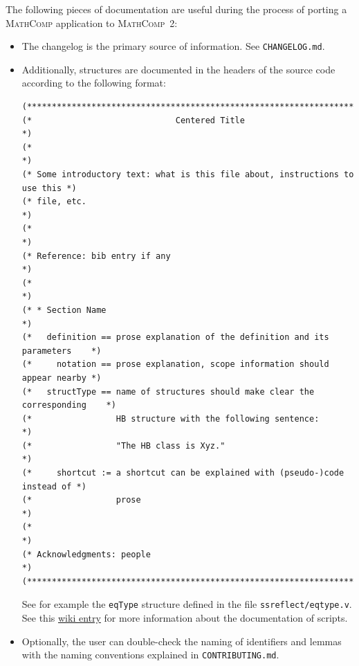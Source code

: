 \documentclass{article}
\def\mathcomp{\textsc{MathComp}}
\def\coqin#1{\texttt{#1}}
\begin{document}
The following pieces of documentation are useful during the process of
porting a \mathcomp{} application to \mathcomp~2:
\begin{itemize}
\item The changelog is the primary source of information. See \coqin{CHANGELOG.md}.
\item Additionally, structures are documented in the headers of the
  source code according to the following format:
\begin{verbatim}
(*****************************************************************************)
(*                             Centered Title                                *)
(*                                                                           *)
(* Some introductory text: what is this file about, instructions to use this *)
(* file, etc.                                                                *)
(*                                                                           *)
(* Reference: bib entry if any                                               *)
(*                                                                           *)
(* * Section Name                                                            *)
(*   definition == prose explanation of the definition and its parameters    *)
(*     notation == prose explanation, scope information should appear nearby *)
(*   structType == name of structures should make clear the corresponding    *)
(*                 HB structure with the following sentence:                 *) 
(*                 "The HB class is Xyz."                                    *)
(*     shortcut := a shortcut can be explained with (pseudo-)code instead of *)
(*                 prose                                                     *)
(*                                                                           *)
(* Acknowledgments: people                                                   *)
(*****************************************************************************)    
\end{verbatim}
See for example the \coqin{eqType} structure defined in the file
\coqin{ssreflect/eqtype.v}.
%
See this
\href{https://github.com/math-comp/analysis/wiki/How-to-document}{wiki
  entry} for more information about the documentation of scripts.
\item Optionally, the user can double-check the naming of identifiers
  and lemmas with the naming conventions explained in
  \coqin{CONTRIBUTING.md}.
\end{itemize}
\end{document}
